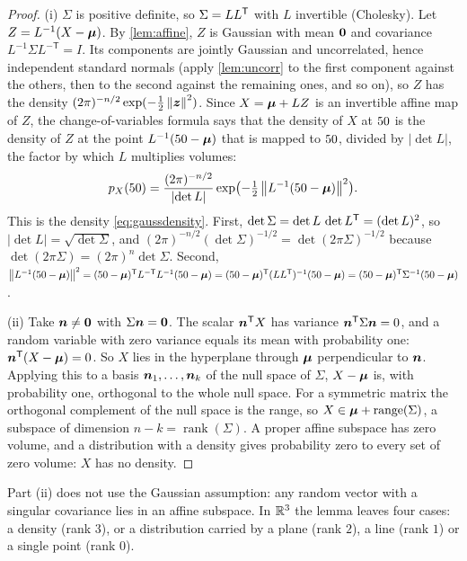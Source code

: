 \begin{proof}
(i) $\Sigma$ is positive definite, so $\Sigma=LL^{\mathsf{T}}$ with $L$ invertible
(Cholesky). Let $Z=L^{-1}(X-\bm{\mu})$. By \cref{lem:affine}, $Z$ is Gaussian
with mean $\bm{0}$ and covariance $L^{-1}\Sigma L^{-\mathsf T}=I$. Its
components are jointly Gaussian and uncorrelated, hence independent
standard normals (apply \cref{lem:uncorr} to the first component against
the others, then to the second against the remaining ones, and so on), so $Z$ has the density
$(2\pi)^{-n/2}\exp(-\tfrac12\left\lVert \bm{z}\right\rVert^2)$. Since $X=\bm{\mu}+LZ$ is an invertible affine map of $Z$, the
change-of-variables formula says that the density of $X$ at $50$ is the
density of $Z$ at the point $L^{-1}(50-\bm{\mu})$ that is mapped to $50$,
divided by $\lvert\det L\rvert$, the factor by which $L$ multiplies
volumes:
\[
  p_X(50)=\frac{(2\pi)^{-n/2}}{\lvert\det L\rvert}
  \exp\bigl(-\tfrac12\left\lVert L^{-1}(50-\bm{\mu})\right\rVert^2\bigr).
\]
This is the density \eqref{eq:gaussdensity}. First,
$\det\Sigma=\det L\,\det L^{\mathsf{T}}=(\det L)^2$, so $\lvert\det L\rvert
=\sqrt{\det\Sigma}$, and $(2\pi)^{-n/2}(\det\Sigma)^{-1/2}
=\det(2\pi\Sigma)^{-1/2}$ because $\det(2\pi\Sigma)=(2\pi)^n\det\Sigma$.
Second, $\left\lVert L^{-1}(50-\bm{\mu})\right\rVert^2=(50-\bm{\mu})^{\mathsf{T}} L^{-\mathsf T}L^{-1}(50-\bm{\mu})
=(50-\bm{\mu})^{\mathsf{T}}(LL^{\mathsf{T}})^{-1}(50-\bm{\mu})=(50-\bm{\mu})^{\mathsf{T}}\Sigma^{-1}(50-\bm{\mu})$.

(ii) Take $\bm{n}\neq\bm{0}$ with $\Sigma\bm{n}=\bm{0}$. The scalar
$\bm{n}^{\mathsf{T}} X$ has variance $\bm{n}^{\mathsf{T}}\Sigma\bm{n}=0$, and a random
variable with zero variance equals its mean with probability one:
$\bm{n}^{\mathsf{T}}(X-\bm{\mu})=0$. So $X$ lies in the hyperplane through $\bm{\mu}$
perpendicular to $\bm{n}$. Applying this to a basis
$\bm{n}_1,\dots,\bm{n}_k$ of the null space of $\Sigma$, $X-\bm{\mu}$ is,
with probability one, orthogonal to the whole null space. For a symmetric
matrix the orthogonal complement of the null space is the range, so
$X\in\bm{\mu}+\operatorname{range}(\Sigma)$, a subspace of dimension
$n-k=\operatorname{rank}(\Sigma)$. A proper affine subspace has zero
volume, and a distribution with a density gives probability zero to every
set of zero volume: $X$ has no density.
\end{proof}

Part (ii) does not use the Gaussian assumption: any random vector with a
singular covariance lies in an affine subspace. In $\mathbb{R}^3$ the lemma leaves
four cases: a density (rank $3$), or a distribution carried by a plane
(rank $2$), a line (rank $1$) or a single point (rank $0$).

